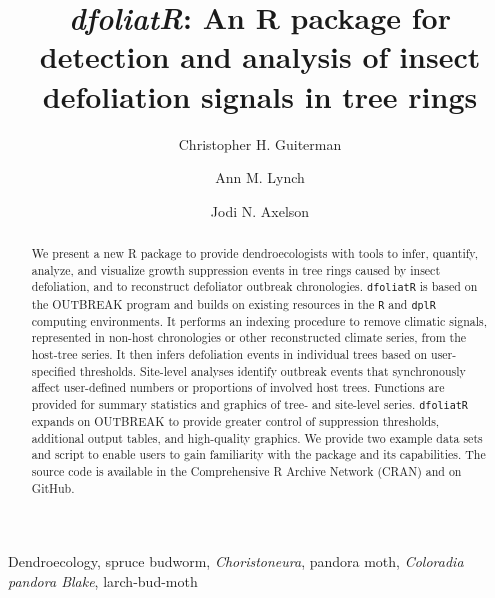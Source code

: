 \documentclass[review]{elsarticle} %
\begin{document}
\begin{frontmatter}

  \title{\emph{dfoliatR}: An R package for detection and analysis of insect defoliation signals in tree rings}
    \author[a,b]{Christopher H. Guiterman}
    \author[a,c]{Ann M. Lynch}
    \author[c]{Jodi N. Axelson}
      \address[a]{Laboratory of Tree-Ring Research, University of Arizona, 1215 E Lowell St.~Box 210045, Tucson, AZ, 85721}
    \address[b]{Three Pines Forest Research, LLC, PO Box 225, Etna, NH, 03750}
    \address[c]{U.S. Forest Service, Rocky Mountain Research Station, 1215 E Lowell St.~Box 210045, Tucson, AZ, 85721}
    \address[d]{Dept of Environmental Science, Policy \& Management, University of California, Berkeley, Berkeley, CA 94720}
  
  \begin{abstract}
  We present a new R package to provide dendroecologists with tools to infer, quantify, analyze, and visualize growth suppression events in tree rings caused by insect defoliation, and to reconstruct defoliator outbreak chronologies. \texttt{dfoliatR} is based on the OUTBREAK program and builds on existing resources in the \texttt{R} and \texttt{dplR} computing environments. It performs an indexing procedure to remove climatic signals, represented in non-host chronologies or other reconstructed climate series, from the host-tree series. It then infers defoliation events in individual trees based on user-specified thresholds. Site-level analyses identify outbreak events that synchronously affect user-defined numbers or proportions of involved host trees. Functions are provided for summary statistics and graphics of tree- and site-level series. \texttt{dfoliatR} expands on OUTBREAK to provide greater control of suppression thresholds, additional output tables, and high-quality graphics. We provide two example data sets and script to enable users to gain familiarity with the package and its capabilities. The source code is available in the Comprehensive R Archive Network (CRAN) and on GitHub.
  \hfill\break
  \end{abstract}
   \begin{keyword} Dendroecology, spruce budworm, \emph{Choristoneura}, pandora moth, \emph{Coloradia pandora Blake}, larch-bud-moth
\newpage\end{keyword}
 \end{frontmatter}
\end{document}
